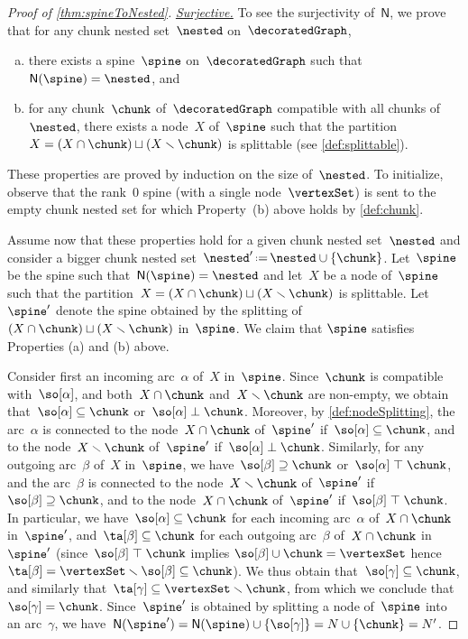 \documentclass{amsart}
\theoremstyle{definition}
\newcommand{\ssm}{\smallsetminus} %
\newcommand{\eqdef}{\mbox{\,\raisebox{0.2ex}{\scriptsize\ensuremath{\mathrm:}}\ensuremath{=}\,}} %
\newcommand{\para}[1]{\medskip\noindent\uline{\textit{#1.}}} %
\newcommand{\negDisjoint}{\perp} %
\newcommand{\posDisjoint}{\;\top\;} %
\newcommand{\spineToNested}{\mathsf{N}} %
\begin{document}
\begin{proof}[Proof of \cref{thm:spineToNested}]
  \para{Surjective}
  To see the surjectivity of~$\spineToNested$, we prove that for any chunk nested set~$\nested$ on~$\decoratedGraph$,
\begin{enumerate}[(a)]
\item there exists a spine~$\spine$ on~$\decoratedGraph$ such that~$\spineToNested(\spine) = \nested$, and
\item for any chunk~$\chunk$ of~$\decoratedGraph$ compatible with all chunks of~$\nested$, there exists a node~$X$ of~$\spine$ such that the partition~$X = (X \cap \chunk) \sqcup (X \ssm \chunk)$ is splittable (see \cref{def:splittable}).
\end{enumerate}
  These properties are proved by induction on the size of~$\nested$.  
  To initialize, observe that the rank~$0$ spine (with a single node~$\vertexSet$) is sent to the empty chunk nested set for which Property~(b) above holds by \cref{def:chunk}.

  Assume now that these properties hold for a given chunk nested set~$\nested$ and consider a bigger chunk nested set~$\nested' \eqdef \nested \cup \{\chunk\}$.
  Let~$\spine$ be the spine such that~$\spineToNested(\spine) = \nested$ and let~$X$ be a node of~$\spine$ such that the partition~$X = (X \cap \chunk) \sqcup (X \ssm \chunk)$ is splittable.
  Let~$\spine'$ denote the spine obtained by the splitting of~$(X \cap \chunk) \sqcup (X \ssm \chunk)$ in~$\spine$.
  We claim that $\spine$ satisfies Properties (a) and (b) above.
  
  Consider first an incoming arc~$\alpha$ of~$X$ in~$\spine$.
  Since~$\chunk$ is compatible with~$\so[\alpha]$, and both~$X \cap \chunk$ and~$X \ssm \chunk$ are non-empty, we obtain that~$\so[\alpha] \subseteq \chunk$ or~$\so[\alpha] \negDisjoint \chunk$.
  Moreover, by \cref{def:nodeSplitting}, the arc~$\alpha$ is connected to the node~$X \cap \chunk$ of~$\spine'$ if~$\so[\alpha] \subseteq \chunk$, and to the node~$X \ssm \chunk$ of~$\spine'$ if~$\so[\alpha] \negDisjoint \chunk$.
  Similarly, for any outgoing arc~$\beta$ of~$X$ in~$\spine$, we have~$\so[\beta] \supseteq \chunk$ or~$\so[\alpha] \posDisjoint \chunk$, and the arc~$\beta$ is connected to the node~$X \ssm \chunk$ of~$\spine'$ if~$\so[\beta] \supseteq \chunk$, and to the node~$X \cap \chunk$ of~$\spine'$ if~$\so[\beta] \posDisjoint \chunk$.
  In particular, we have~$\so[\alpha] \subseteq \chunk$ for each incoming arc~$\alpha$ of~$X \cap \chunk$ in~$\spine'$, and~$\ta[\beta] \subseteq \chunk$ for each outgoing arc~$\beta$ of~$X \cap \chunk$ in~$\spine'$ (since~$\so[\beta] \posDisjoint \chunk$ implies $\so[\beta] \cup \chunk = \vertexSet$ hence $\ta[\beta] = \vertexSet \ssm \so[\beta] \subseteq \chunk$).
  We thus obtain that~$\so[\gamma] \subseteq \chunk$, and similarly that~$\ta[\gamma] \subseteq \vertexSet \ssm \chunk$, from which we conclude that $\so[\gamma] = \chunk$.
  Since~$\spine'$ is obtained by splitting a node of~$\spine$ into an arc~$\gamma$, we have~$\spineToNested(\spine') = \spineToNested(\spine) \cup \{\so[\gamma]\} = N \cup \{\chunk\} = N '$.


\end{proof}
\end{document}
